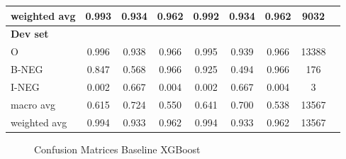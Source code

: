 \begin{table}[!ht]
\begin{tabular}{lccc|ccccc}
weighted avg       &  0.993 &  0.934 &  0.962 & 0.992 & 0.934 & 0.962 & 9032 \\
\hline
\textbf{Dev set}   &        &        &        &       &       & &   \\
O                  &  0.996 &  0.938 &  0.966 & 0.995 & 0.939 & 0.966 & 13388 \\
B-NEG              &  0.847 &  0.568 &  0.966 & 0.925 & 0.494 & 0.966 & 176 \\
I-NEG              &  0.002 &  0.667 &  0.004 & 0.002 & 0.667 & 0.004 & 3 \\
macro avg          &  0.615 &  0.724 &  0.550 & 0.641 & 0.700 & 0.538 & 13567 \\
weighted avg       &  0.994 &  0.933 &  0.962 & 0.994 & 0.933 & 0.962 & 13567 \\
\hline
\end{tabular}
\end{table}




\begin{figure}[!h]
\centering
  \caption{Confusion Matrices Baseline XGBoost}
  \label{fig:base_line_xgb}
\end{figure}


\FloatBarrier



